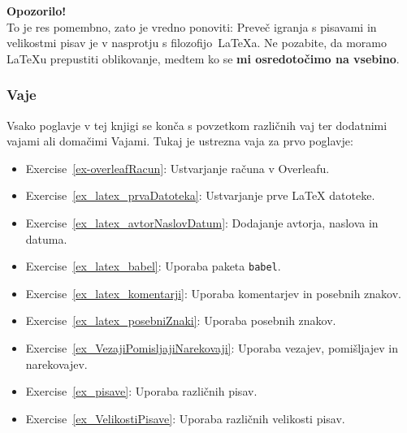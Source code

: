 \begin{framed}
\textbf{Opozorilo!}\\
To je res pomembno, zato je vredno ponoviti:
Preveč igranja s pisavami in velikostmi pisav je v nasprotju s filozofijo~LaTeXa.
Ne pozabite, da moramo LaTeXu prepustiti oblikovanje, medtem ko se \textbf{mi osredotočimo na vsebino}.
\end{framed}

\subsubsection{Vaje}\label{latexUvod_vaje}

Vsako poglavje v tej knjigi se konča s povzetkom različnih vaj ter dodatnimi vajami ali domačimi Vajami. Tukaj je ustrezna vaja za prvo poglavje:

\begin{itemize}
\item Exercise~\ref{ex-overleafRacun}: Ustvarjanje računa v Overleafu.
\item Exercise~\ref{ex_latex_prvaDatoteka}: Ustvarjanje prve LaTeX datoteke.
\item Exercise~\ref{ex_latex_avtorNaslovDatum}: Dodajanje avtorja, naslova in datuma.
\item Exercise~\ref{ex_latex_babel}: Uporaba paketa \texttt{babel}.
\item Exercise~\ref{ex_latex_komentarji}: Uporaba komentarjev in posebnih znakov.
\item Exercise~\ref{ex_latex_posebniZnaki}: Uporaba posebnih znakov.
\item Exercise~\ref{ex_VezajiPomisljajiNarekovaji}: Uporaba vezajev, pomišljajev in narekovajev.
\item Exercise~\ref{ex_pisave}: Uporaba različnih pisav.
\item Exercise~\ref{ex_VelikostiPisave}: Uporaba različnih velikosti pisav.
\end{itemize}